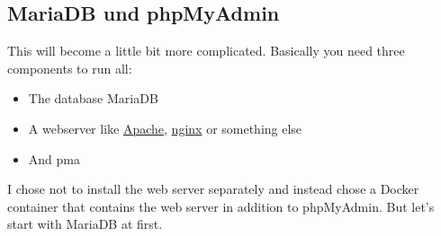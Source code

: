 

\subsection{MariaDB und phpMyAdmin}

This will become a little bit more complicated. Basically you need three
components to run all:

\begin{itemize}
    \item The database \gls{MariaDB}
    \item A webserver like \href{https://httpd.apache.org/}{Apache},
          \href{https://nginx.org/}{nginx} or something else
    \item And \gls{pma}
\end{itemize}

I chose not to install the web server separately and instead chose a Docker
container that contains the web server in addition to phpMyAdmin. But let's
start with \gls{MariaDB} at first.

